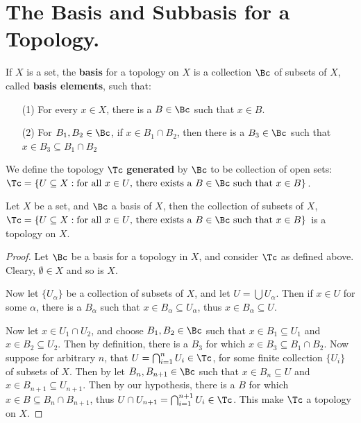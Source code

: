 
\section{The Basis and Subbasis for a Topology.}

\begin{definition}
    If $X$ is a set, the \textbf{basis} for a topology on $X$ is a collection $\Bc$ of
    subsets of  $X$, called \textbf{basis elements}, such that:
        \begin{enumerate}
            \item[(1)] For every $x \in X$, there is a  $B \in \Bc$ such that $x \in B$.

            \item[(2)] For $B_1,B_2 \in \Bc$, if $x \in B_1 \cap B_2$, then there is a
                $B_3 \in \Bc$ such that $x \in B_3 \subseteq B_1 \cap B_2$
        \end{enumerate}
We define the topology $\Tc$ \textbf{generated} by $\Bc$ to be collection of open sets:
$\Tc=\{U \subseteq X: \text{for all } x \in U \text{, there exists a } B \in \Bc
\text{ such that } x \in B\}$.
\end{definition}

\begin{theorem}\label{1.2.1}
    Let $X$ be a set, and  $\Bc$ a basis of  $X$, then the collection of subsets
    of  $X$, $\Tc=\{U \subseteq X: \text{for all } x \in U \text{, there exists a
        } B \in \Bc \text{ such that } x \in B\}$ is a topology on $X$.
\end{theorem}
\begin{proof}
    Let $\Bc$ be a basis for a topology in  $X$, and consider  $\Tc$ as defined
    above. Cleary, $\emptyset \in X$ and so is  $X$.

    Now let  $\{U_{\alpha}\}$ be a collection of subsets of  $X$, and let
    $U=\bigcup{U_{\alpha}}$. Then if  $x \in U$ for some  $\alpha$, there is a
    $B_{\alpha}$ such that  $x \in B_{\alpha} \subseteq U_{\alpha}$, thus  $x \in
    B_{\alpha} \subseteq U$.

    Now let  $x \in  U_1 \cap U_2$, and choose $B_1,B_2 \in \Bc$ such that $x \in B_1 \subseteq U_1$
    and $x \in B_2 \subseteq U_2$. Then  by definition, there is a $B_3$ for which $x \in B_3 \subseteq B_1 \cap B_2$.
    Now suppose for arbitrary $n$, that  $U=\bigcap_{i=1}^{n}{U_i} \in \Tc$, for some finite
    collection  $\{U_i\}$ of subsets of  $X$. Then by let  $B_n, B_{n+1} \in \Bc$ such that
    $x \in B_n \subseteq U$ and  $x \in B_{n+1} \subseteq U_{n+1}$. Then by our hypothesis, there is a  $B$
for which  $x \in B \subseteq B_n \cap B_{n+1}$, thus  $U \cap U_{n+1}=\bigcap_{i=1}^{n+1}{U_i} \in \Tc$.
This make $\Tc$ a topology on  $X$.
\end{proof}


